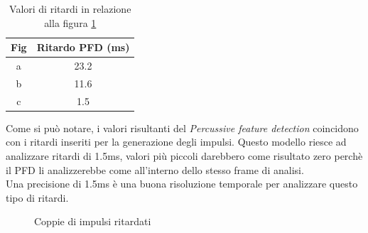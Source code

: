 \documentclass[12pt]{report}
\begin{document}
\begin{table}[h]
\begin{center}
\begin{tabular}{|c|c|}
\hline
{\bfseries Fig} & Ritardo PFD (ms) \\
\hline
a & 23.2 \\

b & 11.6\\

c & 1.5\\
\hline
\end{tabular}
\end{center}
\caption{Valori di ritardi in relazione alla figura \ref{impulsi}}
\label{tab:onset}
\end{table}

Come si può notare, i valori risultanti del {\itshape Percussive feature detection} coincidono con i ritardi inseriti per la generazione degli impulsi. Questo modello riesce ad analizzare ritardi di 1.5ms, valori più piccoli darebbero come risultato zero perchè il PFD li analizzerebbe come all'interno dello stesso frame di analisi.\\
Una precisione di 1.5ms è una buona risoluzione temporale per analizzare questo tipo di ritardi.

\begin{figure}[htbp] 
\centering 
{} 
\hspace{7mm} 
\caption{Coppie di impulsi ritardati} 
\label{impulsi}
\end{figure}
 
\end{document}
